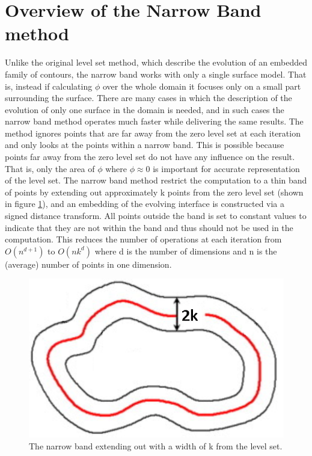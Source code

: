 \section{Overview of the Narrow Band method}
Unlike the original level set method, which describe the evolution of an embedded family of contours, the narrow band works with only a single surface model\cite{whitaker89}. That is, instead if calculating $\phi$ over the whole domain it focuses only on a small part surrounding the surface. There are many cases in which the description of the evolution of only one surface in the domain is needed, and in such cases the narrow band method operates much faster while delivering the same results. The method ignores points that are far away from the zero level set at each iteration and only looks at the points within a narrow band. This is possible because points far away from the zero level set do not have any influence on the result. That is, only the area of $\phi$ where \(\phi \approx 0\) is important for accurate representation of the level set. The narrow band method restrict the computation to a thin band of points by extending out approximately k points from the zero level set (shown in figure \ref{narrowBand}), and an embedding of the evolving interface is constructed via a signed distance transform. All points outside the band is set to constant values to indicate that they are not within the band and thus should not be used in the computation. This reduces the number of operations at each iteration from \(O(n^{d+1})\) to \(O(nk^{d})\) \cite{adalsteinsson94} where d is the number of dimensions and n is the (average) number of points in one dimension. 
\begin{figure}[h!]
\centering
\includegraphics[width=.5\textwidth]{levelset/narrowBand}
\caption{The narrow band extending out with a width of k from the level set.}
\label{narrowBand}
\end{figure}
